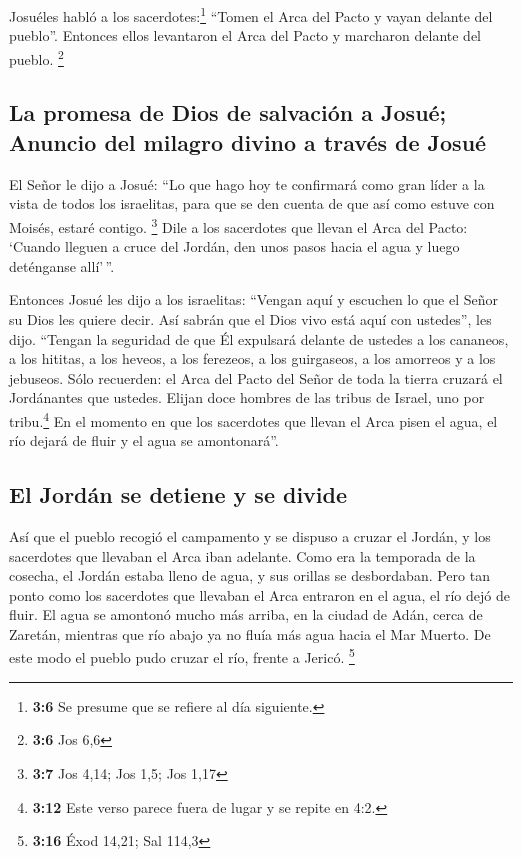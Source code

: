  Josuéles habló a los sacerdotes:\footnote{\textbf{3:6} Se
  presume que se refiere al día siguiente.} ``Tomen el Arca del Pacto y
vayan delante del pueblo''. Entonces ellos levantaron el Arca del Pacto
y marcharon delante del pueblo. \footnote{\textbf{3:6} Jos 6,6}

\hypertarget{la-promesa-de-dios-de-salvaciuxf3n-a-josuuxe9-anuncio-del-milagro-divino-a-travuxe9s-de-josuuxe9}{%
\subsection{La promesa de Dios de salvación a Josué; Anuncio del milagro
divino a través de
Josué}\label{la-promesa-de-dios-de-salvaciuxf3n-a-josuuxe9-anuncio-del-milagro-divino-a-travuxe9s-de-josuuxe9}}

 El Señor le dijo a Josué: ``Lo que hago hoy te confirmará
como gran líder a la vista de todos los israelitas, para que se den
cuenta de que así como estuve con Moisés, estaré contigo. \footnote{\textbf{3:7}
  Jos 4,14; Jos 1,5; Jos 1,17}  Dile a los sacerdotes que
llevan el Arca del Pacto: `Cuando lleguen a cruce del Jordán, den unos
pasos hacia el agua y luego deténganse allí'\,''.

 Entonces Josué les dijo a los israelitas: ``Vengan aquí y
escuchen lo que el Señor su Dios les quiere decir.  Así
sabrán que el Dios vivo está aquí con ustedes'', les dijo. ``Tengan la
seguridad de que Él expulsará delante de ustedes a los cananeos, a los
hititas, a los heveos, a los ferezeos, a los guirgaseos, a los amorreos
y a los jebuseos.  Sólo recuerden: el Arca del Pacto del
Señor de toda la tierra cruzará el Jordánantes que ustedes.
 Elijan doce hombres de las tribus de Israel, uno por
tribu.\footnote{\textbf{3:12} Este verso parece fuera de lugar y se
  repite en 4:2.}  En el momento en que los sacerdotes
que llevan el Arca pisen el agua, el río dejará de fluir y el agua se
amontonará''.

\hypertarget{el-jorduxe1n-se-detiene-y-se-divide}{%
\subsection{El Jordán se detiene y se
divide}\label{el-jorduxe1n-se-detiene-y-se-divide}}

 Así que el pueblo recogió el campamento y se dispuso a
cruzar el Jordán, y los sacerdotes que llevaban el Arca iban adelante.
 Como era la temporada de la cosecha, el Jordán estaba
lleno de agua, y sus orillas se desbordaban. Pero tan ponto como los
sacerdotes que llevaban el Arca entraron en el agua, el río dejó de
fluir.  El agua se amontonó mucho más arriba, en la
ciudad de Adán, cerca de Zaretán, mientras que río abajo ya no fluía más
agua hacia el Mar Muerto. De este modo el pueblo pudo cruzar el río,
frente a Jericó. \footnote{\textbf{3:16} Éxod 14,21; Sal 114,3}

